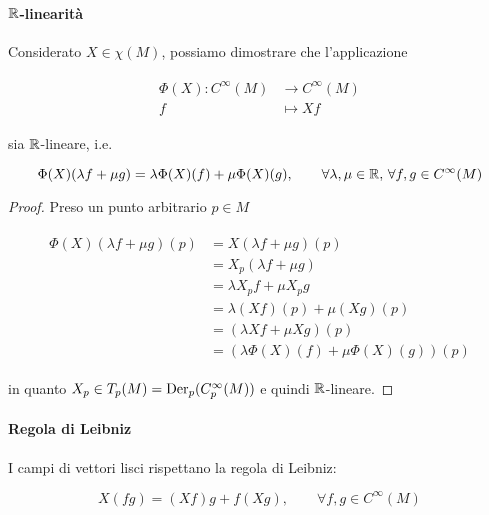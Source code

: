 \paragraph{$ \mathbb{R} $-linearità}

Considerato $ X \in \chi(M) $, possiamo dimostrare che l'applicazione

\begin{align}
	\begin{split}
		\Phi(X) : C^{\infty}(M) &\to C^{\infty}(M)\\
		f &\mapsto X f
	\end{split}
\end{align}

sia $ \mathbb{R} $-lineare, i.e.

\begin{equation}
	\Phi(X)(\lambda f + \mu g) = \lambda \Phi(X)(f) + \mu \Phi(X)(g), \qquad \forall \lambda,\mu \in \mathbb{R}, \, \forall f,g \in C^{\infty}(M)
\end{equation}

\begin{proof}
	Preso un punto arbitrario $ p \in M $
	
	\begin{align}
		\begin{split}
			\Phi(X)(\lambda f + \mu g)(p) &= X(\lambda f + \mu g)(p)\\
			&= X_{p}(\lambda f + \mu g)\\
			&= \lambda X_{p} f + \mu X_{p} g\\
			&= \lambda (X f)(p) + \mu (X g)(p)\\
			&= (\lambda X f + \mu X g)(p)\\
			&= (\lambda \Phi(X)(f) + \mu \Phi(X)(g))(p)
		\end{split}
	\end{align}

	in quanto $ X_{p} \in T_{p}(M) = \operatorname{Der}_{p}(C_{p}^{\infty}(M)) $ e quindi $ \mathbb{R} $-lineare.
\end{proof}

\paragraph{Regola di Leibniz}

I campi di vettori lisci rispettano la regola di Leibniz:

\begin{equation}
	X(f g) = (X f) g + f (X g), \qquad \forall f,g \in C^{\infty}(M)
\end{equation}

